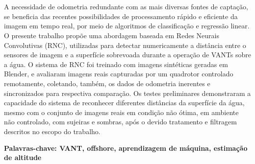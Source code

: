 \section*{} 
A necessidade de odometria redundante com as mais diversas fontes de captação, se beneficia das recentes possibilidades de processamento rápido e eficiente da imagem em tempo real, por meio de algoritmos de classificação e regressão linear. O presente trabalho propõe uma abordagem baseada em Redes Neurais Convolutivas (RNC), utilizadas para detectar numericamente a distância entre o sensores de imagem e a superfície sobrevoada durante a operação de VANTs sobre a água. O sistema de RNC foi treinado com imagens sintéticas geradas em Blender, e avaliaram imagens reais capturadas por um quadrotor controlado remotamente, coletando, também, os dados de odometria inerentes e sincronizados para respectiva comparação. Os testes preliminares demonstraram a capacidade do sistema de reconhecer diferentes distâncias da superfície da água, mesmo com o conjunto de imagens reais em condição não ótima, em ambiente não controlado, com sujeiras e sombras, após o devido tratamento e filtragem descritos no escopo do trabalho.

{\bf Palavras-chave: VANT, offshore, aprendizagem de máquina, estimação de altitude} 


